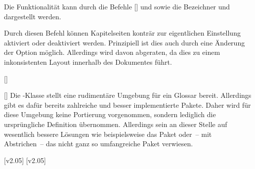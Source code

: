 \begin{Bundle*}{}
\begin{Declaration}{}
\printdeclarationlist%
%
Die Funktionalität kann durch die Befehle [] 
und  sowie die Bezeichner  und 
 dargestellt werden.
\end{Declaration}

\begin{Declaration}{}
\printdeclarationlist%
%
Durch diesen Befehl können Kapitelseiten konträr zur eigentlichen Einstellung 
aktiviert oder deaktiviert werden. Prinzipiell ist dies auch durch eine 
Änderung der Option  möglich. Allerdings wird davon 
abgeraten, da dies zu einem inkonsistenten Layout innerhalb des Dokumentes 
führt.
\end{Declaration}

\begin{Declaration}{[]}
\begin{Declaration}{[]}
\printdeclarationlist%
%
Die -Klasse stellt eine rudimentäre Umgebung für ein Glossar 
bereit. Allerdings gibt es dafür bereits zahlreiche und besser implementierte 
Pakete. Daher wird für diese Umgebung keine Portierung vorgenommen, sondern 
lediglich die ursprüngliche Definition übernommen. Allerdings sein an dieser 
Stelle auf wesentlich bessere Lösungen wie beispielsweise das Paket 
 oder~-- mit Abstrichen~-- das nicht ganz so umfangreiche 
Paket  verwiesen.
\end{Declaration}
\end{Declaration}
%
%
%
[v2.05]
%
[v2.05]
%
\end{Bundle*}
